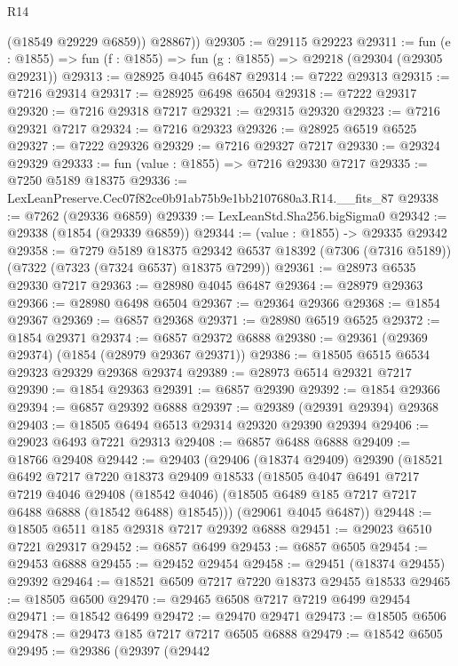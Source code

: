 \begin{lexlean}{R14}
\begin{coremodule}
          (@18549 @29229 @6859))
        @28867))
@29305 := @29115 @29223
@29311 := fun (e : @1855) => fun (f : @1855) => fun (g : @1855) => @29218 (@29304 (@29305 @29231))
@29313 := @28925 @4045 @6487
@29314 := @7222 @29313
@29315 := @7216 @29314
@29317 := @28925 @6498 @6504
@29318 := @7222 @29317
@29320 := @7216 @29318 @7217
@29321 := @29315 @29320
@29323 := @7216 @29321 @7217
@29324 := @7216 @29323
@29326 := @28925 @6519 @6525
@29327 := @7222 @29326
@29329 := @7216 @29327 @7217
@29330 := @29324 @29329
@29333 := fun (value : @1855) => @7216 @29330 @7217
@29335 := @7250 @5189 @18375
@29336 := LexLeanPreserve.Cec07f82ce0b91ab75b9e1bb2107680a3.R14.__fits_87
@29338 := @7262 (@29336 @6859)
@29339 := LexLeanStd.Sha256.bigSigma0
@29342 := @29338 (@1854 (@29339 @6859))
@29344 := (value : @1855) -> @29335 @29342
@29358 := @7279
    @5189
    @18375
    @29342
    @6537
    @18392
    (@7306 (@7316 @5189))
    (@7322 (@7323 (@7324 @6537) @18375 @7299))
@29361 := @28973 @6535 @29330 @7217
@29363 := @28980 @4045 @6487
@29364 := @28979 @29363
@29366 := @28980 @6498 @6504
@29367 := @29364 @29366
@29368 := @1854 @29367
@29369 := @6857 @29368
@29371 := @28980 @6519 @6525
@29372 := @1854 @29371
@29374 := @6857 @29372 @6888
@29380 := @29361 (@29369 @29374) (@1854 (@28979 @29367 @29371))
@29386 := @18505 @6515 @6534 @29323 @29329 @29368 @29374
@29389 := @28973 @6514 @29321 @7217
@29390 := @1854 @29363
@29391 := @6857 @29390
@29392 := @1854 @29366
@29394 := @6857 @29392 @6888
@29397 := @29389 (@29391 @29394) @29368
@29403 := @18505 @6494 @6513 @29314 @29320 @29390 @29394
@29406 := @29023 @6493 @7221 @29313
@29408 := @6857 @6488 @6888
@29409 := @18766 @29408
@29442 := @29403
    (@29406
      (@18374 @29409)
      @29390
      (@18521
        @6492
        @7217
        @7220
        @18373
        @29409
        @18533
        (@18505
          @4047
          @6491
          @7217
          @7219
          @4046
          @29408
          (@18542 @4046)
          (@18505 @6489 @185 @7217 @7217 @6488 @6888 (@18542 @6488) @18545)))
      (@29061 @4045 @6487))
@29448 := @18505 @6511 @185 @29318 @7217 @29392 @6888
@29451 := @29023 @6510 @7221 @29317
@29452 := @6857 @6499
@29453 := @6857 @6505
@29454 := @29453 @6888
@29455 := @29452 @29454
@29458 := @29451 (@18374 @29455) @29392
@29464 := @18521 @6509 @7217 @7220 @18373 @29455 @18533
@29465 := @18505 @6500
@29470 := @29465 @6508 @7217 @7219 @6499 @29454
@29471 := @18542 @6499
@29472 := @29470 @29471
@29473 := @18505 @6506
@29478 := @29473 @185 @7217 @7217 @6505 @6888
@29479 := @18542 @6505
@29495 := @29386
    (@29397
      (@29442

\end{coremodule}
\end{lexlean}
